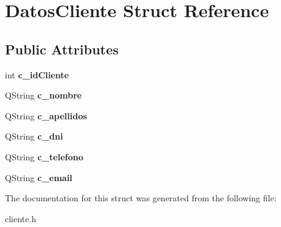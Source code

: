 \hypertarget{structDatosCliente}{}\section{Datos\+Cliente Struct Reference}
\label{structDatosCliente}
\subsection*{Public Attributes}
\begin{DoxyCompactItemize}
\item 
\mbox{\label{structDatosCliente_a3c987bd40818269c092eccb33c769e51}} 
int {\bfseries c\+\_\+id\+Cliente}
\item 
\mbox{\label{structDatosCliente_af3d3562318239d1f486162ebfac6839d}} 
Q\+String {\bfseries c\+\_\+nombre}
\item 
\mbox{\label{structDatosCliente_aa429684aafc98843348bbcaf19aa5b00}} 
Q\+String {\bfseries c\+\_\+apellidos}
\item 
\mbox{\label{structDatosCliente_a421ae342a0dc1e50919a3bb8214c845f}} 
Q\+String {\bfseries c\+\_\+dni}
\item 
\mbox{\label{structDatosCliente_a818b3e911921bb73efab698d294fb07f}} 
Q\+String {\bfseries c\+\_\+telefono}
\item 
\mbox{\label{structDatosCliente_a53899759fdbf632cae136e0d6a7a6658}} 
Q\+String {\bfseries c\+\_\+email}
\end{DoxyCompactItemize}


The documentation for this struct was generated from the following file\+:\begin{DoxyCompactItemize}
\item 
cliente.\+h\end{DoxyCompactItemize}

